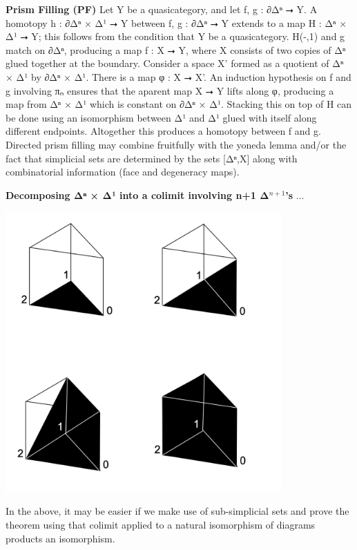\documentclass{book}
\theoremstyle{definition}
\begin{document}
{\bf Prism Filling (PF)} Let Y be a quasicategory, and let f, g : ∂Δⁿ ⭢ Y. A homotopy h : ∂Δⁿ × Δ¹ ⭢ Y between f, g : ∂Δⁿ ⭢ Y extends to a map H : Δⁿ × Δ¹ ⭢ Y; this follows from the condition that Y be a quasicategory. H(-,1) and g match on ∂Δⁿ, producing a map f : X ⭢ Y, where X consists of two copies of Δⁿ glued together at the boundary. Consider a space X' formed as a quotient of Δⁿ × Δ¹ by ∂Δⁿ × Δ¹. There is a map φ : X ⭢ X'. An induction hypothesis on f and g involving πₙ ensures that the aparent map X ⭢ Y lifts along φ, producing a map from Δⁿ × Δ¹ which is constant on ∂Δⁿ × Δ¹. Stacking this on top of H can be done using an isomorphism between Δ¹ and Δ¹ glued with itself along different endpoints. Altogether this produces a homotopy between f and g.\\

Directed prism filling may combine fruitfully with the yoneda lemma and/or the fact that simplicial sets are determined by the sets [Δⁿ,X] along with combinatorial information (face and degeneracy maps).

{\bf Decomposing Δⁿ × Δ¹ into a colimit involving n+1 Δ${}^{n+1}$'s} ...

\begin{center}
\includegraphics[width=300pt]{prismfilling.png}
\end{center}

In the above, it may be easier if we make use of sub-simplicial sets and prove the theorem using that colimit applied to a natural isomorphism of diagrams products an isomorphism.\\
\end{document}
